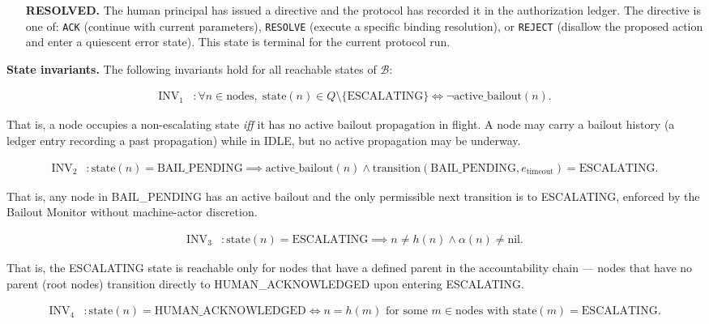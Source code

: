 \begin{itemize}
\item[\textbf{RESOLVED.}] The human principal has issued a directive and the protocol has recorded it in the authorization ledger. The directive is one of: \texttt{ACK} (continue with current parameters), \texttt{RESOLVE} (execute a specific binding resolution), or \texttt{REJECT} (disallow the proposed action and enter a quiescent error state). This state is terminal for the current protocol run.
\end{itemize}

\bigskip
\noindent\textbf{State invariants.} The following invariants hold for all reachable states of $\mathcal{B}$:

\begin{align}
\text{INV}_1 &: \forall n \in \text{nodes},\; \text{state}(n) \in Q \setminus \{\text{ESCALATING}\} \iff \neg\text{active\_bailout}(n). \tag{INV-1}
\end{align}

That is, a node occupies a non-escalating state \emph{iff} it has no active bailout propagation in flight. A node may carry a bailout history (a ledger entry recording a past propagation) while in IDLE, but no active propagation may be underway.

\begin{align}
\text{INV}_2 &: \text{state}(n) = \text{BAIL\_PENDING} \implies \text{active\_bailout}(n) \land \text{transition}(\text{BAIL\_PENDING}, e_{\text{timeout}}) = \text{ESCALATING}. \tag{INV-2}
\end{align}

That is, any node in BAIL\_PENDING has an active bailout and the only permissible next transition is to ESCALATING, enforced by the Bailout Monitor without machine-actor discretion.

\begin{align}
\text{INV}_3 &: \text{state}(n) = \text{ESCALATING} \implies n \neq h(n) \land \alpha(n) \neq \text{nil}. \tag{INV-3}
\end{align}

That is, the ESCALATING state is reachable only for nodes that have a defined parent in the accountability chain — nodes that have no parent (root nodes) transition directly to HUMAN\_ACKNOWLEDGED upon entering ESCALATING.

\begin{align}
\text{INV}_4 &: \text{state}(n) = \text{HUMAN\_ACKNOWLEDGED} \iff n = h(m) \text{ for some } m \in \text{nodes} \text{ with } \text{state}(m) = \text{ESCALATING}. \tag{INV-4}
\end{align}

